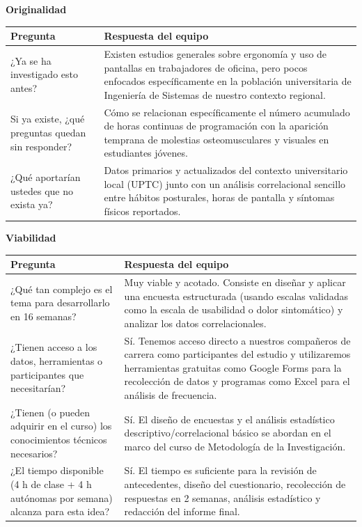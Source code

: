 \documentclass[12pt,letterpaper]{article}
\begin{document}
\bigskip
\noindent\textbf{Originalidad}
\begin{center}
\begin{tabularx}{\textwidth}{L{5.5cm} X}
\toprule
\textbf{Pregunta} & \textbf{Respuesta del equipo}\\
\midrule
¿Ya se ha investigado esto antes? & Existen estudios generales sobre ergonomía y uso de pantallas en trabajadores de oficina, pero pocos enfocados específicamente en la población universitaria de Ingeniería de Sistemas de nuestro contexto regional.\\
Si ya existe, ¿qué preguntas quedan sin responder? & Cómo se relacionan específicamente el número acumulado de horas continuas de programación con la aparición temprana de molestias osteomusculares y visuales en estudiantes jóvenes.\\
¿Qué aportarían ustedes que no exista ya? & Datos primarios y actualizados del contexto universitario local (UPTC) junto con un análisis correlacional sencillo entre hábitos posturales, horas de pantalla y síntomas físicos reportados.\\
\bottomrule
\end{tabularx}
\end{center}

\bigskip
\noindent\textbf{Viabilidad}
\begin{center}
\begin{tabularx}{\textwidth}{L{5.5cm} X}
\toprule
\textbf{Pregunta} & \textbf{Respuesta del equipo}\\
\midrule
¿Qué tan complejo es el tema para desarrollarlo en 16 semanas? & Muy viable y acotado. Consiste en diseñar y aplicar una encuesta estructurada (usando escalas validadas como la escala de usabilidad o dolor sintomático) y analizar los datos correlacionales.\\
¿Tienen acceso a los datos, herramientas o participantes que necesitarían? & Sí. Tenemos acceso directo a nuestros compañeros de carrera como participantes del estudio y utilizaremos herramientas gratuitas como Google Forms para la recolección de datos y programas como Excel para el análisis de frecuencia.\\
¿Tienen (o pueden adquirir en el curso) los conocimientos técnicos necesarios? & Sí. El diseño de encuestas y el análisis estadístico descriptivo/correlacional básico se abordan en el marco del curso de Metodología de la Investigación.\\
¿El tiempo disponible (4 h de clase + 4 h autónomas por semana) alcanza para esta idea? & Sí. El tiempo es suficiente para la revisión de antecedentes, diseño del cuestionario, recolección de respuestas en 2 semanas, análisis estadístico y redacción del informe final.\\
\bottomrule
\end{tabularx}
\end{center}
\end{document}
